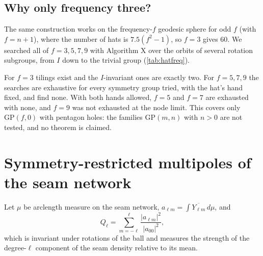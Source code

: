 \documentclass[11pt]{article}
\theoremstyle{definition}
\theoremstyle{remark}
\begin{document}
\subsection{Why only frequency three?}\label{sec:freq}
The same construction works on the frequency-$f$ geodesic sphere for odd $f$ (with $f=n+1$), where the number of hats is $7.5(f^2-1)$, so $f=3$ gives $60$. We searched all of $f=3,5,7,9$ with Algorithm X over the orbits of several rotation subgroups,
from $I$ down to the trivial group (\cref{tab:hatfreq}).
\begin{table}[tbp]\centering\footnotesize

\caption{Hat tilings of $\mathrm{GP}(f,0)$ with pentagonal holes, by the symmetry group imposed. An entry is the number of tilings found; ``$\ge$'' means the search was stopped at the limit without exhausting the space, and $0^{*}$ means it was stopped at the node limit without finding any tiling.}\label{tab:hatfreq}
\end{table}
For $f=3$ tilings exist and the $I$-invariant ones are exactly two. For $f=5,7,9$ the searches are exhaustive for every symmetry group tried, with the hat's hand fixed, and find none. With both hands allowed, $f=5$ and $f=7$ are exhausted with none, and $f=9$ was not exhausted at the node limit.
This covers only $\mathrm{GP}(f,0)$ with pentagon holes: the families $\mathrm{GP}(m,n)$ with $n>0$ are not tested, and no theorem is claimed.

\section{Symmetry-restricted multipoles of the seam network}\label{sec:multipoles}
Let $\mu$ be arclength measure on the seam network, $a_{\ell m}=\int\overline{Y_{\ell m}}\,d\mu$, and
\begin{equation}
 Q_\ell=\sum_{m=-\ell}^{\ell}\frac{|a_{\ell m}|^2}{|a_{00}|^2},
\end{equation}
which is invariant under rotations of the ball and measures the strength of the degree-$\ell$ component of the seam density relative to its mean.
\end{document}
